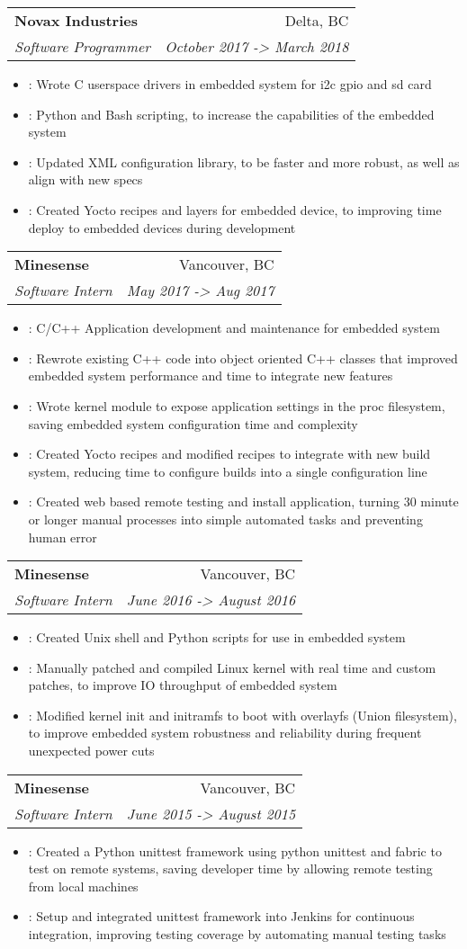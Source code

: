 \documentclass[letterpaper,11pt]{article}
\makeatletter
\newcommand{\resumeItem}[2]{
  \item\small{
    \textbf{#1}{: #2 \vspace{-2pt}}
  }
}
\newcommand{\resumeSubheading}[4]{
  \vspace{-1pt}\item
    \begin{tabular*}{0.97\textwidth}[t]{l@{\extracolsep{\fill}}r}
      \textbf{#1} & #2 \\
      \textit{\small#3} & \textit{\small #4} \\
    \end{tabular*}\vspace{-5pt}
}
\newcommand{\resumeItemListStart}{\begin{itemize}}
\newcommand{\resumeItemListEnd}{\end{itemize}\vspace{-5pt}}
\makeatother
\begin{document}
    \resumeSubheading
      {Novax Industries}{Delta, BC}
      {Software Programmer}{October 2017 -> March 2018}
      \resumeItemListStart
        \resumeItem{} {Wrote C userspace drivers in embedded system for i2c gpio and sd card}
        \resumeItem{} {Python and Bash scripting, to increase the capabilities of the embedded system}
        \resumeItem{} {Updated XML configuration library, to be faster and more robust, as well as align with new specs}
        \resumeItem{} {Created Yocto recipes and layers for embedded device, to improving time deploy to embedded devices during development}
      \resumeItemListEnd

    \resumeSubheading
      {Minesense}{Vancouver, BC}
      {Software Intern}{May 2017 -> Aug 2017}
      \resumeItemListStart
        \resumeItem{} {C/C++ Application development and maintenance for embedded system}
        \resumeItem{} {Rewrote existing C++ code into object oriented C++ classes that improved embedded system performance and time to integrate new features}
        \resumeItem{} {Wrote kernel module to expose application settings in the proc filesystem, saving embedded system configuration time and complexity}
        \resumeItem{} {Created Yocto recipes and modified recipes to integrate with new build system, reducing time to configure builds into a single configuration line}
        \resumeItem{} {Created web based remote testing and install application, turning 30 minute or longer manual processes into simple automated tasks and preventing human error}
      \resumeItemListEnd

    \resumeSubheading
      {Minesense}{Vancouver, BC}
      {Software Intern}{June 2016 -> August 2016}
      \resumeItemListStart
        \resumeItem{} {Created Unix shell and Python scripts for use in embedded system}
        \resumeItem{} {Manually patched and compiled Linux kernel with real time and custom patches, to improve IO throughput of embedded system}
        \resumeItem{} {Modified kernel init and initramfs to boot with overlayfs (Union filesystem), to improve embedded system robustness and reliability during frequent unexpected power cuts}
      \resumeItemListEnd

    \resumeSubheading
      {Minesense}{Vancouver, BC}
      {Software Intern}{June 2015 -> August 2015}
      \resumeItemListStart
        \resumeItem{} {Created a Python unittest framework using python unittest and fabric to test on remote systems, saving developer time by allowing remote testing from local machines}
        \resumeItem{} {Setup and integrated unittest framework into Jenkins for continuous integration, improving testing coverage by automating manual testing tasks}
      \resumeItemListEnd
\end{document}
